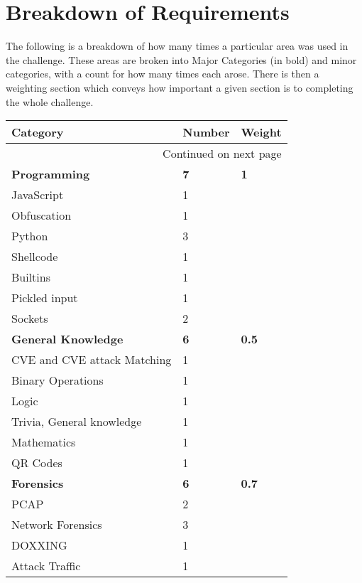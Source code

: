 \documentclass[twoside,a4paper,11pt]{report}
\begin{document}
	\section{Breakdown of Requirements}
	 	The following is a breakdown of how many times a particular area was used in the challenge. 
		These areas are broken into Major Categories (in bold) and minor categories, with a count for how many times each arose. 
		There is then a weighting section which conveys how important a given section is to completing the whole challenge. 
		\begin{center}
			\begin{longtable}{| l | l | l |}
				\hline
				\textbf{Category} & \textbf{Number} & \textbf{Weight} \\ \hline 
				\endhead
				\multicolumn{3}{|r|}{{Continued on next page}} \\ \hline
				\endfoot
				\endlastfoot
				\textbf{Programming} & \textbf{7} & \textbf{1} \\ \hline
				\quad JavaScript & 1 & \\ \hline 
				\quad Obfuscation & 1 & \\ \hline
				\quad Python & 3 & \\ \hline 
				\qquad Shellcode & 1 & \\ \hline 
				\qquad Builtins & 1 & \\ \hline 
				\qquad Pickled input & 1 & \\ \hline 
				\quad Sockets & 2 & \\ \hline 
				\textbf{General Knowledge} & \textbf{6} & \textbf{0.5}\\ \hline 
				\quad CVE and CVE attack Matching & 1 & \\ \hline 
				\quad Binary Operations & 1 & \\ \hline 
				\quad Logic & 1 & \\ \hline 
				\quad Trivia, General knowledge & 1 & \\ \hline 
				\quad Mathematics & 1 & \\ \hline 
				\quad QR Codes & 1 & \\ \hline 
				\textbf{Forensics} & \textbf{6} & \textbf{0.7}\\ \hline
				\quad PCAP & 2 & \\ \hline
				\quad Network Forensics & 3 & \\ \hline 
				\quad DOXXING & 1 & \\ \hline 
				\quad Attack Traffic & 1 & \\ \hline 

\end{longtable}
\end{center}
\end{document}
